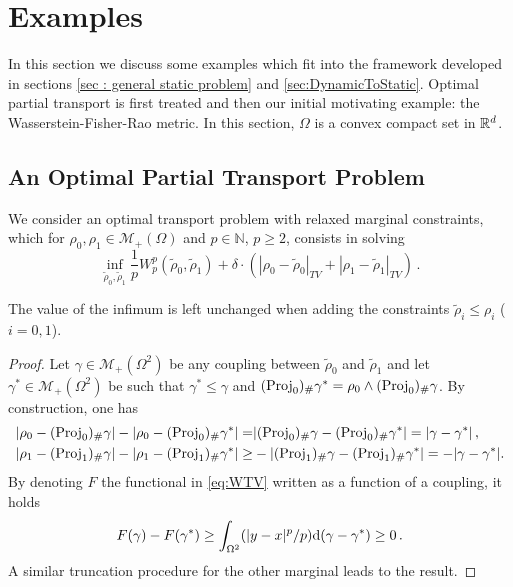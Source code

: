 
\section[Examples]{Examples}\label{sec:Examples}

In this section we discuss some examples which fit into the framework developed in sections \ref{sec : general static problem} and \ref{sec:DynamicToStatic}. Optimal partial transport is first treated and then our initial motivating example: the Wasserstein-Fisher-Rao metric. In this section, $\Omega$ is a convex compact set in $\mathbb{R}^d$.

\subsection{An Optimal Partial Transport Problem}
\label{sec:ExamplesPartial}
We consider an optimal transport problem with relaxed marginal constraints, which for $\rho_0,\rho_1 \in \mathcal{M}_+(\Omega)$ and $p\in \mathbb{N}$, $p\geq 2$, consists in solving
 \begin{equation}\label{eq:WTV}
 \inf_{\tilde{\rho}_0, \tilde{\rho}_1} \frac1p W_p^p(\tilde{\rho}_0,\tilde{\rho}_1) + \delta \cdot (|\rho_0- \tilde{\rho}_0|_{TV}+|\rho_1 - \tilde{\rho}_1|_{TV}) \, .
 \end{equation}
 \begin{proposition}\label{prop: constraints partial}
The value of the infimum is left unchanged when adding the constraints $\tilde{\rho}_i \leq \rho_i$ ($i=0,1$).
 \end{proposition}
 \begin{proof}
 Let $\gamma \in \mathcal{M}_+(\Omega^2)$ be any coupling between $\tilde{\rho}_0$ and $\tilde{\rho}_1$ and let $\gamma^* \in \mathcal{M}_+(\Omega^2)$ be such that $\gamma^* \leq \gamma$ and $(\operatorname{Proj}_0)_\# \gamma^* =\rho_0 \wedge (\operatorname{Proj}_0)_\# \gamma$. By construction, one has
 \begin{align*}
 |\rho_0-(\operatorname{Proj}_0)_\# \gamma| - |\rho_0-(\operatorname{Proj}_0)_\# \gamma^*| = &|(\operatorname{Proj}_0)_\# \gamma-(\operatorname{Proj}_0)_\# \gamma^*| = |\gamma-\gamma^*| \, ,\\
  |\rho_1-(\operatorname{Proj}_1)_\# \gamma| - |\rho_1-(\operatorname{Proj}_1)_\# \gamma^*| \geq &- |(\operatorname{Proj}_1)_\# \gamma-(\operatorname{Proj}_1)_\# \gamma^*| = - |\gamma-\gamma^*|.
 \end{align*}
By denoting $F$ the functional in \eqref{eq:WTV} written as a function of  a coupling, it holds
 \[
 F(\gamma)-F(\gamma^*) \geq \int_{\Omega^2} (|y-x|^p/p)\mathrm{d} (\gamma-\gamma^*) \geq 0 \, .
 \]
A similar truncation procedure for the other marginal leads to the result.
 \end{proof}
